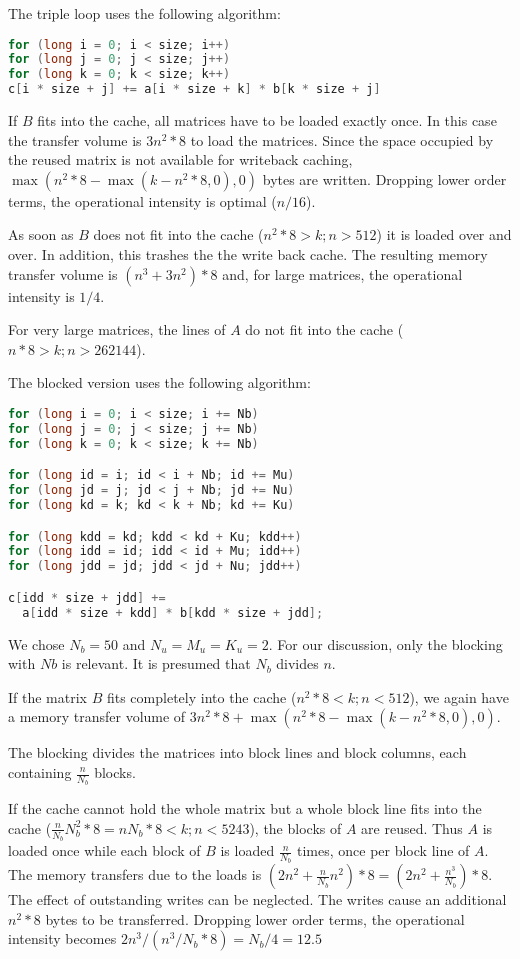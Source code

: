 \documentclass[a4paper,12pt]{article}
\begin{document}
The triple loop uses the following algorithm:

\begin{lstlisting}[language=C] 
for (long i = 0; i < size; i++) 
for (long j = 0; j < size; j++) 
for (long k = 0; k < size; k++) 
c[i * size + j] += a[i * size + k] * b[k * size + j]
\end{lstlisting}

If $B$ fits into the cache, all matrices have to be loaded exactly once. In this
case the transfer volume is $3n^2*8$ to load the matrices. Since the space
occupied by the reused matrix is not available for writeback caching,
$\max(n^2*8-\max(k-n^2*8,0),0)$ bytes are written. Dropping lower order terms,
the operational intensity is optimal ($n/16$). 

As soon as $B$ does not fit into the cache ($n^2*8>k;n>512$) it is loaded over
and over. In addition, this trashes the the write back cache. The resulting
memory transfer volume is $(n^3+3n^2)*8$ and, for large matrices, the
operational intensity is $1/4$.

For very large matrices, the lines of $A$ do not fit into the cache 
($n*8>k;n>262144$). 
 
The blocked version uses the following algorithm:

\begin{lstlisting}[language=C] 
for (long i = 0; i < size; i += Nb)
for (long j = 0; j < size; j += Nb)
for (long k = 0; k < size; k += Nb)

for (long id = i; id < i + Nb; id += Mu)
for (long jd = j; jd < j + Nb; jd += Nu)
for (long kd = k; kd < k + Nb; kd += Ku)

for (long kdd = kd; kdd < kd + Ku; kdd++)
for (long idd = id; idd < id + Mu; idd++)
for (long jdd = jd; jdd < jd + Nu; jdd++)

c[idd * size + jdd] += 
  a[idd * size + kdd] * b[kdd * size + jdd];
\end{lstlisting}

We chose $N_b=50$ and $N_u=M_u=K_u=2$.
For our discussion, only the blocking with $Nb$ is relevant. It is presumed that
$N_b$ divides $n$. 

If the matrix $B$ fits completely into the cache ($n^2*8<k;n<512$), we again
have a memory transfer volume of $3n^2*8+\max(n^2*8-\max(k-n^2*8,0),0)$. 

The blocking divides the matrices into block lines and block columns, each
containing $\frac{n}{N_b}$ blocks.

If the cache cannot hold the whole matrix but a whole block line fits into the
cache ($\frac{n}{N_b}N_b^2*8=nN_b*8<k;n<5243$), the blocks of $A$ are reused.
Thus $A$ is loaded once while each block of $B$ is loaded $\frac{n}{N_b}$ times,
once per block line of $A$. The memory transfers due to the loads is
$(2n^2+\frac{n}{N_b}n^2)*8=(2n^2+\frac{n^3}{N_b})*8$. The effect of outstanding
writes can be neglected. The writes cause an additional $n^2*8$ bytes to be
transferred. Dropping lower order terms, the operational intensity becomes
$2n^3/(n^3/N_b*8)=N_b/4=12.5$
\end{document}
